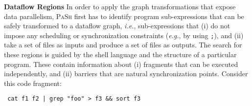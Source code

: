 \documentclass[sigplan, review, screen, anonymous]{acmart}
\newcommand{\eg}{{\em e.g.}, }
\newcommand{\ie}{{\em i.e.}, }
\newcommand{\heading}[1]{\vspace{4pt}\noindent\textbf{#1}\enspace}
\newcommand{\ttt}[1]{\texttt{#1}}
\newcommand{\kk}[1]{[{\color{magenta}kk: #1}]}
\newcommand{\sx}[1]{(\S\ref{#1})}
\newcommand{\sys}{{\scshape PaSh}\xspace}
\begin{document}
% 
% 
% 
% 
%

\heading{Dataflow Regions}
In order to apply the graph transformations that expose data parallelism, \sys first has to identify program sub-expressions that can be safely transformed to a dataflow graph, 
  \ie sub-expressions that (i) do not impose any scheduling or synchronization constraints (\eg by using \ttt{;}), and (ii) take a set of files as inputs and produce a set of files as outputs.
The search for these regions is guided by the shell language and the structure of a particular program.
These contain information about (i) fragments that can be executed independently, and (ii) barriers that are natural synchronization points. %
Consider this code fragment:

\begin{verbatim}
 cat f1 f2 | grep "foo" > f3 && sort f3 
\end{verbatim}
\end{document}
